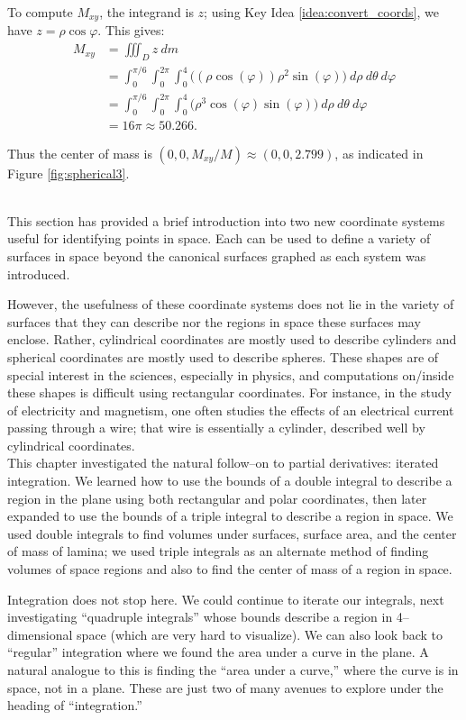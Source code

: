 {To compute $M_{xy}$, the integrand is $z$; using Key Idea \ref{idea:convert_coords}, we have $z = \rho\cos\varphi$. This gives:
\begin{align*}
M_{xy} &= \iiint_D z\ dm \\
	&= \int_0^{\pi/6}\int_0^{2\pi}\int_0^4 \big((\rho\cos(\varphi))\rho^2\sin(\varphi)\big) \ d\rho\ d\theta\ d\varphi\\
	&= \int_0^{\pi/6}\int_0^{2\pi}\int_0^4 \big(\rho^3\cos(\varphi)\sin(\varphi)\big) \ d\rho\ d\theta\ d\varphi\\
	&=16\pi \approx 50.266.
\end{align*}

Thus the center of mass is $(0,0,M_{xy}/M) \approx (0,0,2.799)$, as indicated in Figure \ref{fig:spherical3}. 
}\\

This section has provided a brief introduction into two new coordinate systems useful for identifying points in space. Each can be used to define a variety of surfaces in space beyond the canonical surfaces graphed as each system was introduced.

However, the usefulness of these coordinate systems does not lie in the variety of surfaces that they can describe nor the regions in space these surfaces may enclose. Rather,  cylindrical coordinates are mostly used to describe cylinders and spherical coordinates are mostly used to describe spheres. These shapes are of special interest in the sciences, especially in physics, and computations on/inside these shapes is difficult using rectangular coordinates. For instance, in the study of electricity and magnetism, one often studies the effects of an electrical current passing through a wire; that wire is essentially a cylinder, described well by cylindrical coordinates. \\

This chapter investigated the natural follow--on to partial derivatives: iterated integration. We learned how to use the bounds of a double integral to describe a region in the plane using both rectangular and polar coordinates, then later expanded to use the bounds of a triple integral to describe a region in space. We used double integrals to find volumes under surfaces, surface area, and the center of mass of lamina; we used triple integrals as an alternate method of finding volumes of space regions and also to find the center of mass of a region in space.

Integration does not stop here. We could continue to iterate our integrals, next investigating ``quadruple integrals'' whose bounds describe a region in 4--dimensional space (which are very hard to visualize). We can also look back to ``regular'' integration where we found the area under a curve in the plane. A natural analogue to this is finding the ``area under a curve,'' where the curve is in space, not in a plane. These are just two of many avenues to explore under the heading of ``integration.''


